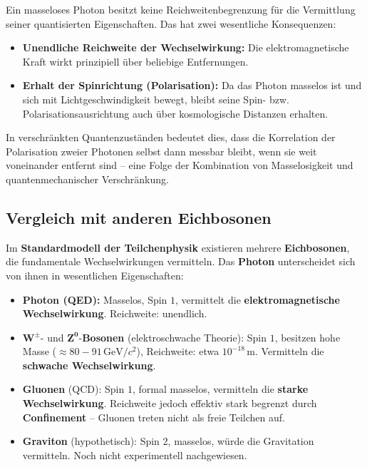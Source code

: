 \begin{tcolorbox}[physikbox, title=Masseloses Photon und Spinwirkung über große Distanzen]
	\label{box:photon_spin_reichweite}
	\small
	Ein masseloses Photon besitzt keine Reichweitenbegrenzung für die Vermittlung seiner quantisierten Eigenschaften.  
	Das hat zwei wesentliche Konsequenzen:
	\begin{itemize}
		\item \textbf{Unendliche Reichweite der Wechselwirkung:} Die elektromagnetische Kraft wirkt prinzipiell über beliebige Entfernungen.
		\item \textbf{Erhalt der Spinrichtung (Polarisation):} Da das Photon masselos ist und sich mit Lichtgeschwindigkeit bewegt, bleibt seine Spin- bzw. Polarisationsausrichtung auch über kosmologische Distanzen erhalten. 
	\end{itemize}
	In verschränkten Quantenzuständen bedeutet dies, dass die Korrelation der Polarisation zweier Photonen selbst dann messbar bleibt, wenn sie weit voneinander entfernt sind – eine Folge der Kombination von Masselosigkeit und quantenmechanischer Verschränkung.
\end{tcolorbox}


\subsection{Vergleich mit anderen Eichbosonen}

Im \textbf{Standardmodell der Teilchenphysik} existieren mehrere \textbf{Eichbosonen}, die fundamentale Wechselwirkungen vermitteln.  
Das \textbf{Photon} unterscheidet sich von ihnen in wesentlichen Eigenschaften:

\begin{itemize}
	\item \textbf{Photon (QED):} Masselos, Spin \(1\), vermittelt die \textbf{elektromagnetische Wechselwirkung}.  
	Reichweite: unendlich.
	
	\item \(\mathbf{W^\pm}\)- und \(\mathbf{Z^0}\)-\textbf{Bosonen} (elektroschwache Theorie):  
	Spin \(1\), besitzen hohe Masse (\(\approx 80{-}91\,\mathrm{GeV}/c^2\)), Reichweite: etwa \(10^{-18}\,\mathrm{m}\).  
	Vermitteln die \textbf{schwache Wechselwirkung}.
	
	\item \textbf{Gluonen} (QCD):  
	Spin \(1\), formal masselos, vermitteln die \textbf{starke Wechselwirkung}.  
	Reichweite jedoch effektiv stark begrenzt durch \textbf{Confinement} – Gluonen treten nicht als freie Teilchen auf.
	
	\item \textbf{Graviton} (hypothetisch):  
	Spin \(2\), masselos, würde die Gravitation vermitteln.  
	Noch nicht experimentell nachgewiesen.
\end{itemize}

